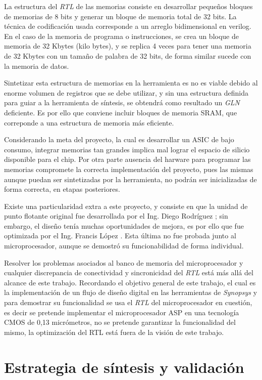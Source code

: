 La estructura del \textit{RTL} de las memorias consiste en desarrollar pequeños bloques de memorias de 8 bits y generar un bloque de memoria total de 32 bits. La técnica de codificación usada corresponde a un arreglo bidimensional en verilog. En el caso de la memoria de programa o instrucciones, se crea un bloque de memoria de 32 Kbytes (kilo bytes), y se replica 4 veces para tener una memoria de 32 Kbytes con un tamaño de palabra de 32 bits, de forma similar sucede con la memoria de datos.

Sintetizar esta estructura de memorias en la herramienta es no es viable debido al enorme volumen de registros que se debe utilizar, y sin una estructura definida para guiar a la herramienta de síntesis, se obtendrá como resultado un \textit{GLN} deficiente. Es por ello que conviene incluir bloques de memoria SRAM, que correponde a una estructura de memoria más eficiente.

Considerando la meta del proyecto, la cual es desarrollar un ASIC de bajo consumo, integrar memorias tan grandes implica mal lograr el espacio de silicio disponible para el chip. Por otra parte ausencia del harware para programar las memorias compromete la correcta implementación del proyecto, pues las mismas aunque puedan ser sintetizadas por la herramienta, no podrán ser inicializadas de forma correcta, en etapas posteriores.

Existe una particularidad extra a este proyecto, y consiste en que la unidad de punto flotante original fue desarrollada por el Ing. Diego Rodríguez \cite{Diego2015}; sin embargo, el diseño tenía muchas oportunidades de mejora, es por ello que fue optimizada por el Ing. Francis López \cite{Francis2016}. Esta última no fue probada junto al microprocesador, aunque se demostró su funcionabilidad de forma individual.

Resolver los problemas asociados al banco de memoria del microprocesador y cualquier discrepancia de conectividad y sincronicidad del \textit{RTL} está más allá del alcance de este trabajo. Recordando el objetivo general de este trabajo, el cual es la implementación de un flujo de diseño digital en las herramientas de \textit{Synopsys} y para demostrar su funcionalidad se usa el \textit{RTL} del microprocesador en cuestión, es decir se pretende implementar el microprocesador ASP en una tecnología CMOS de 0,13 micrómetros, no se pretende garantizar la funcionalidad del mismo, la optimización del RTL está fuera de la visión de este trabajo.

\section{Estrategia de síntesis y validación}


